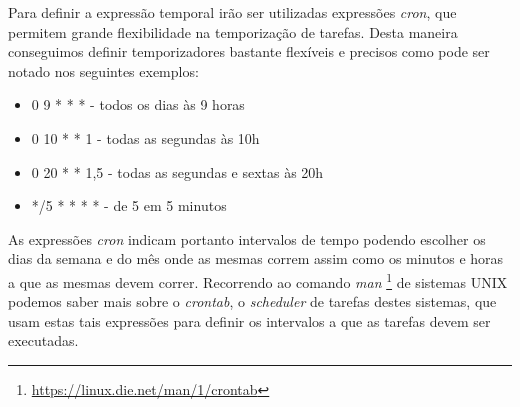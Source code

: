 Para definir a expressão temporal irão ser utilizadas expressões \textit{cron}, que permitem grande flexibilidade na temporização de tarefas. Desta maneira conseguimos definir temporizadores bastante flexíveis e precisos como pode ser notado nos seguintes exemplos:
\begin{itemize}
    \item 0 9 * * * - todos os dias às 9 horas
    \item 0 10 * * 1 - todas as segundas às 10h
    \item 0 20 * * 1,5 - todas as segundas e sextas às 20h
    \item */5 * * * * - de 5 em 5 minutos
\end{itemize}

As expressões \textit{cron} indicam portanto intervalos de tempo podendo escolher os dias da semana e do mês onde as mesmas correm assim como os minutos e horas a que as mesmas devem correr. Recorrendo ao comando \textit{man} \footnote{\url{https://linux.die.net/man/1/crontab}} de sistemas UNIX podemos saber mais sobre o \textit{crontab}, o \textit{scheduler} de tarefas destes sistemas, que usam estas tais expressões para definir os intervalos a que as tarefas devem ser executadas.

